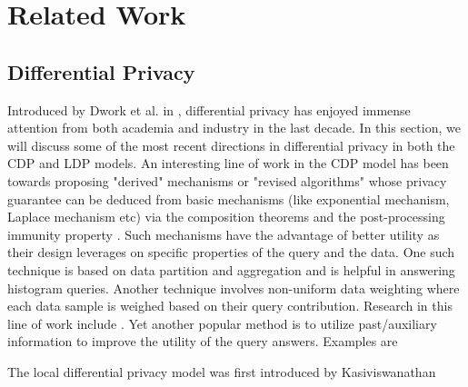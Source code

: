 \section{Related Work}
\subsection{Differential Privacy}
Introduced by Dwork et al. in \cite{Dork}, differential privacy has enjoyed immense attention from both academia and industry in the last decade. In this section, we will discuss some of the most recent directions in differential privacy in both the \textsf{CDP} and \textsf{LDP} models. An interesting line of work in the \textsf{CDP} model has been towards proposing "derived" mechanisms \cite{MVG} or  "revised algorithms" \cite{Blocki} whose privacy guarantee can be deduced from basic mechanisms (like exponential mechanism, Laplace mechanism etc) via the composition theorems and
the post-processing immunity property \cite{Dork}. Such mechanisms have the advantage of better utility as their design leverages on  specific properties of the query and the data.   One such technique is based on data partition and aggregation  \cite{AHP,hist1,hist2,hist3,hist4,hist6,hist7,hist8} and is helpful in answering histogram queries. Another technique involves 
non-uniform data weighting where each data sample is weighed based on their query contribution. Research in this line of work include \cite{u1,u2,MWEM}. Yet another popular method is to utilize past/auxiliary information
to improve the utility of the query answers. Examples are \cite{A1,A2,A3,A4,A6,A7,A8}
\par
The local differential privacy model was first introduced by Kasiviswanathan
